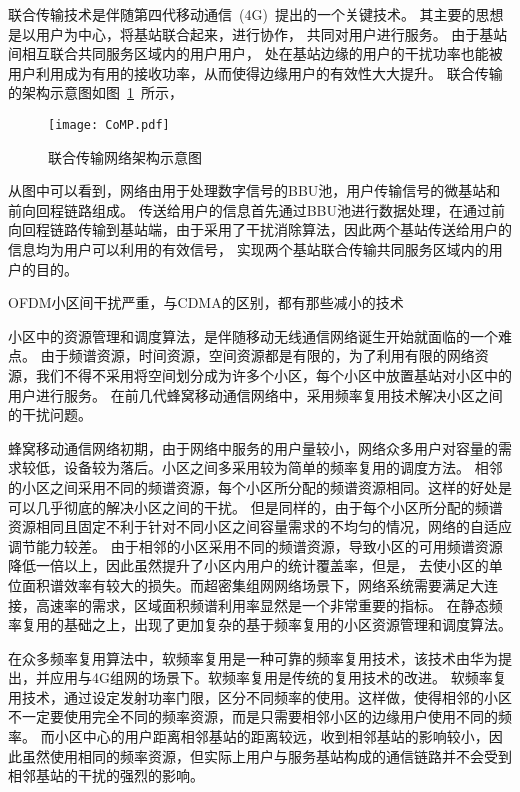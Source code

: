 联合传输技术是伴随第四代移动通信~(4G)~提出的一个关键技术。
其主要的思想是以用户为中心，将基站联合起来，进行协作，
共同对用户进行服务。
由于基站间相互联合共同服务区域内的用户用户，
处在基站边缘的用户的干扰功率也能被用户利用成为有用的接收功率，从而使得边缘用户的有效性大大提升。
联合传输的架构示意图如图~\ref{CoMP}~所示，
\begin{figure}[htbp]
\centering
\texttt{[image: CoMP.pdf]}
\caption{联合传输网络架构示意图}\vspace{-0.5em}
\label{CoMP}
\end{figure}
从图中可以看到，网络由用于处理数字信号的BBU池，用户传输信号的微基站和前向回程链路组成。
传送给用户的信息首先通过BBU池进行数据处理，在通过前向回程链路传输到基站端，由于采用了干扰消除算法，因此两个基站传送给用户的信息均为用户可以利用的有效信号，
实现两个基站联合传输共同服务区域内的用户的目的。

OFDM小区间干扰严重，与CDMA的区别，都有那些减小的技术

小区中的资源管理和调度算法，是伴随移动无线通信网络诞生开始就面临的一个难点。
由于频谱资源，时间资源，空间资源都是有限的，为了利用有限的网络资源，我们不得不采用将空间划分成为许多个小区，每个小区中放置基站对小区中的用户进行服务。
在前几代蜂窝移动通信网络中，采用频率复用技术解决小区之间的干扰问题。

蜂窝移动通信网络初期，由于网络中服务的用户量较小，网络众多用户对容量的需求较低，设备较为落后。小区之间多采用较为简单的频率复用的调度方法。
相邻的小区之间采用不同的频谱资源，每个小区所分配的频谱资源相同。这样的好处是可以几乎彻底的解决小区之间的干扰。
但是同样的，由于每个小区所分配的频谱资源相同且固定不利于针对不同小区之间容量需求的不均匀的情况，网络的自适应调节能力较差。
由于相邻的小区采用不同的频谱资源，导致小区的可用频谱资源降低一倍以上，因此虽然提升了小区内用户的统计覆盖率，但是，
去使小区的单位面积谱效率有较大的损失。而超密集组网网络场景下，网络系统需要满足大连接，高速率的需求，区域面积频谱利用率显然是一个非常重要的指标。
在静态频率复用的基础之上，出现了更加复杂的基于频率复用的小区资源管理和调度算法。

在众多频率复用算法中，软频率复用是一种可靠的频率复用技术，该技术由华为提出，并应用与4G组网的场景下。软频率复用是传统的复用技术的改进。
软频率复用技术，通过设定发射功率门限，区分不同频率的使用。这样做，使得相邻的小区不一定要使用完全不同的频率资源，而是只需要相邻小区的边缘用户使用不同的频率。
而小区中心的用户距离相邻基站的距离较远，收到相邻基站的影响较小，因此虽然使用相同的频率资源，但实际上用户与服务基站构成的通信链路并不会受到相邻基站的干扰的强烈的影响。

